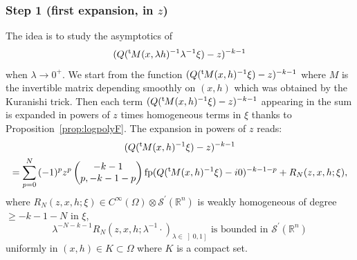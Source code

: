 \documentclass[JEP,XML,SOM,Unicode]{cedram}
\let\pazocal\mathscr
\theoremstyle{definition}
\DeclareMathOperator*{\pf}{fp}
\newcommand{\opencl}[1]{\mathopen{}\mathclose{\left]#1 \right]}}
\newcommand{\step}[1]{\subsubsection*{Step #1}}
\renewcommand{\t}{{{}^{\mathrm{t}\mkern-2mu}}}
\begin{document}
\step{1 (first expansion, in $z$)}
The idea is to study the asymptotics
of
\[
(Q(\t M(x,\lambda h)^{-1}\lambda^{-1}\xi)-z)^{-k-1}
\]
when $\lambda\to 0^+$.
We start from the function
$(Q(\t M(x,h)^{-1}\xi)-{z})^{-k-1} $ where $M$ is the invertible matrix
depending smoothly on $(x,h)$ which was obtained by the Kuranishi trick.
Then each term $(Q(\t M(x,h)^{-1}\xi)-z)^{-k-1} $
appearing in the sum is expanded in powers of $z$ times homogeneous terms in $\xi$
{thanks to Proposition~\ref{prop:logpolyF}}.
The expansion in powers of $z$ reads:
\begin{multline*}
(Q(\t M(x, h)^{-1}\xi)-z)^{-k-1}\\
=\sum_{p=0}^N {(-1)^p} z^p \begin{pmatrix}
-k-1\\
p,-k-1-p
\end{pmatrix}
\pf(Q(\t M(x, h)^{-1}\xi)-i0)^{-k-1-p} +R_N(z,x,h;\xi),
\end{multline*}
where $R_N(z,x,h;\xi)\in C^\infty(\Omega)\otimes \pazocal{S}^\prime(\mathbb{R}^n)$ is weakly homogeneous of degree $\geqslant -k-1-N$ in $\xi$, \ie
\[
\lambda^{-N-k-1}R_N(z,x,h;\lambda^{-1}\cdot)_{\lambda\in \opencl{0,1}} \text{ is bounded in }\pazocal{S}^\prime(\mathbb{R}^n)
\]
uniformly in $(x,h)\in K\subset \Omega$ where $K$ is a compact set.
\end{document}

